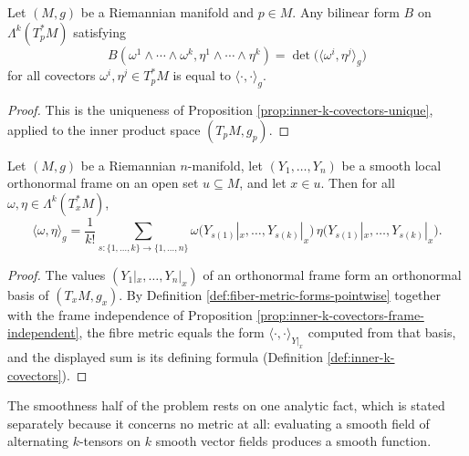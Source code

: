 \begin{lemma}
\label{lem:fiber-metric-forms-unique-pointwise}
\leanok
{}
Let $(M,g)$ be a Riemannian manifold and $p \in M$. Any bilinear form $B$ on $\Lambda^k(T_p^*M)$ satisfying
\[
B(\omega^1 \wedge \cdots \wedge \omega^k, \eta^1 \wedge \cdots \wedge \eta^k) = \det\big(\langle \omega^i, \eta^j \rangle_g\big)
\]
for all covectors $\omega^i, \eta^j \in T_p^*M$ is equal to $\langle \cdot, \cdot \rangle_g$.
\end{lemma}
\begin{proof}
\leanok
{}
This is the uniqueness of Proposition \ref{prop:inner-k-covectors-unique}, applied to the inner product space $(T_pM, g_p)$.
\end{proof}

\begin{lemma}
\label{lem:fiber-metric-forms-frame}
\leanok
{}
Let $(M,g)$ be a Riemannian $n$-manifold, let $(Y_1, \ldots, Y_n)$ be a smooth local orthonormal frame on an open set $u \subseteq M$, and let $x \in u$. Then for all $\omega, \eta \in \Lambda^k(T_x^*M)$,
\[
\langle \omega, \eta \rangle_g = \frac{1}{k!} \sum_{s \colon \{1,\ldots,k\} \to \{1,\ldots,n\}} \omega\big(Y_{s(1)}|_x, \ldots, Y_{s(k)}|_x\big)\, \eta\big(Y_{s(1)}|_x, \ldots, Y_{s(k)}|_x\big).
\]
\end{lemma}
\begin{proof}
\leanok
{}
The values $(Y_1|_x, \ldots, Y_n|_x)$ of an orthonormal frame form an orthonormal basis of $(T_xM, g_x)$. By Definition \ref{def:fiber-metric-forms-pointwise} together with the frame independence of Proposition \ref{prop:inner-k-covectors-frame-independent}, the fibre metric equals the form $\langle \cdot, \cdot \rangle_{Y|_x}$ computed from that basis, and the displayed sum is its defining formula (Definition \ref{def:inner-k-covectors}).
\end{proof}

The smoothness half of the problem rests on one analytic fact, which is stated separately because it concerns no metric at all: evaluating a smooth field of alternating $k$-tensors on $k$ smooth vector fields produces a smooth function.

